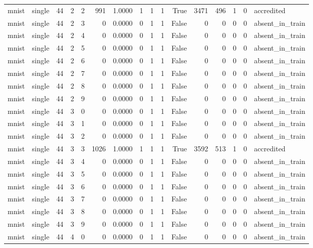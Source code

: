 \begin{tabular}{llrrrrrrrrrrrrrl}
mnist & single & 44 & 2 & 2 & 991 & 1.0000 & 1 & 1 & 1 & True & 3471 & 496 & 1 & 0 & accredited \\
mnist & single & 44 & 2 & 3 & 0 & 0.0000 & 0 & 1 & 1 & False & 0 & 0 & 0 & 0 & absent\_in\_train \\
mnist & single & 44 & 2 & 4 & 0 & 0.0000 & 0 & 1 & 1 & False & 0 & 0 & 0 & 0 & absent\_in\_train \\
mnist & single & 44 & 2 & 5 & 0 & 0.0000 & 0 & 1 & 1 & False & 0 & 0 & 0 & 0 & absent\_in\_train \\
mnist & single & 44 & 2 & 6 & 0 & 0.0000 & 0 & 1 & 1 & False & 0 & 0 & 0 & 0 & absent\_in\_train \\
mnist & single & 44 & 2 & 7 & 0 & 0.0000 & 0 & 1 & 1 & False & 0 & 0 & 0 & 0 & absent\_in\_train \\
mnist & single & 44 & 2 & 8 & 0 & 0.0000 & 0 & 1 & 1 & False & 0 & 0 & 0 & 0 & absent\_in\_train \\
mnist & single & 44 & 2 & 9 & 0 & 0.0000 & 0 & 1 & 1 & False & 0 & 0 & 0 & 0 & absent\_in\_train \\
mnist & single & 44 & 3 & 0 & 0 & 0.0000 & 0 & 1 & 1 & False & 0 & 0 & 0 & 0 & absent\_in\_train \\
mnist & single & 44 & 3 & 1 & 0 & 0.0000 & 0 & 1 & 1 & False & 0 & 0 & 0 & 0 & absent\_in\_train \\
mnist & single & 44 & 3 & 2 & 0 & 0.0000 & 0 & 1 & 1 & False & 0 & 0 & 0 & 0 & absent\_in\_train \\
mnist & single & 44 & 3 & 3 & 1026 & 1.0000 & 1 & 1 & 1 & True & 3592 & 513 & 1 & 0 & accredited \\
mnist & single & 44 & 3 & 4 & 0 & 0.0000 & 0 & 1 & 1 & False & 0 & 0 & 0 & 0 & absent\_in\_train \\
mnist & single & 44 & 3 & 5 & 0 & 0.0000 & 0 & 1 & 1 & False & 0 & 0 & 0 & 0 & absent\_in\_train \\
mnist & single & 44 & 3 & 6 & 0 & 0.0000 & 0 & 1 & 1 & False & 0 & 0 & 0 & 0 & absent\_in\_train \\
mnist & single & 44 & 3 & 7 & 0 & 0.0000 & 0 & 1 & 1 & False & 0 & 0 & 0 & 0 & absent\_in\_train \\
mnist & single & 44 & 3 & 8 & 0 & 0.0000 & 0 & 1 & 1 & False & 0 & 0 & 0 & 0 & absent\_in\_train \\
mnist & single & 44 & 3 & 9 & 0 & 0.0000 & 0 & 1 & 1 & False & 0 & 0 & 0 & 0 & absent\_in\_train \\
mnist & single & 44 & 4 & 0 & 0 & 0.0000 & 0 & 1 & 1 & False & 0 & 0 & 0 & 0 & absent\_in\_train \\

\end{tabular}
